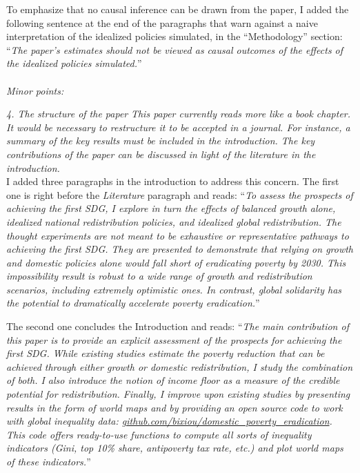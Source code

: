 \documentclass[12pt,english]{article}
\begin{document}
To emphasize that no causal inference can be drawn from the paper, I added the following sentence at the end of the paragraphs that warn against a naive interpretation of the idealized policies simulated, in the ``Methodology'' section: ``\textit{The paper's estimates should not be viewed as causal outcomes of the effects of the idealized policies simulated.}''
~\\ ~\\

\textit{Minor points:}
 
\textit{4.	The structure of the paper}
\textit{This paper currently reads more like a book chapter. It would be necessary to restructure it to be accepted in a journal. For instance, a summary of the key results must be included in the introduction. The key contributions of the paper can be discussed in light of the literature in the introduction.}~\\

I added three paragraphs in the introduction to address this concern. The first one is right before the \textit{Literature} paragraph and reads: ``\textit{To assess the prospects of achieving the first SDG, I explore in turn the effects of balanced growth alone, idealized national redistribution policies, and idealized global redistribution. The thought experiments are not meant to be exhaustive or representative pathways to achieving the first SDG. They are presented to demonstrate that relying on growth and domestic policies alone would fall short of eradicating poverty by 2030. This impossibility result is robust to a wide range of growth and redistribution scenarios, including extremely optimistic ones. In contrast, global solidarity has the potential to dramatically accelerate poverty eradication.}''

The second one concludes the Introduction and reads: ``\textit{The main contribution of this paper is to provide an explicit assessment of the prospects for achieving the first SDG. While existing studies estimate the poverty reduction that can be achieved through either growth or domestic redistribution, I study the combination of both. I also introduce the notion of \textit{income floor} as a measure of the credible potential for redistribution. Finally, I improve upon existing studies by presenting results in the form of world maps and by providing an open source code to work with global inequality data: \href{https://github.com/bixiou/domestic_poverty_eradication}{github.com/bixiou/domestic\_poverty\_eradication}. This code offers ready-to-use functions to compute all sorts of inequality indicators (Gini, top 10\% share, antipoverty tax rate, etc.) and plot world maps of these indicators.}''
\end{document}
